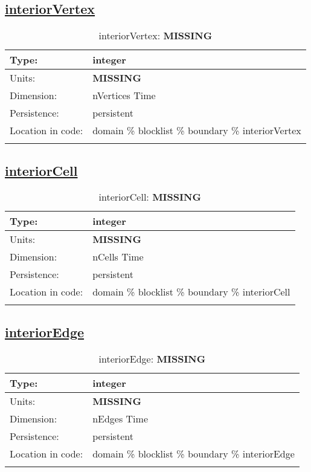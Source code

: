 \subsection[interiorVertex]{\hyperref[sec:var_tab_boundary]{interiorVertex}}
\label{subsec:var_sec_boundary_interiorVertex}
\begin{center}
\begin{longtable}{| p{2.0in} | p{4.0in} |}
        \hline 
        Type: & integer \\
        \hline 
        Units: & {\bf \color{red} MISSING} \\
        \hline 
        Dimension: & nVertices Time \\
        \hline 
        Persistence: & persistent \\
        \hline 
         Location in code: & domain \% blocklist \% boundary \% interiorVertex \\
         \hline 
    \caption{interiorVertex: {\bf \color{red} MISSING}}
\end{longtable}
\end{center}
\subsection[interiorCell]{\hyperref[sec:var_tab_boundary]{interiorCell}}
\label{subsec:var_sec_boundary_interiorCell}
\begin{center}
\begin{longtable}{| p{2.0in} | p{4.0in} |}
        \hline 
        Type: & integer \\
        \hline 
        Units: & {\bf \color{red} MISSING} \\
        \hline 
        Dimension: & nCells Time \\
        \hline 
        Persistence: & persistent \\
        \hline 
         Location in code: & domain \% blocklist \% boundary \% interiorCell \\
         \hline 
    \caption{interiorCell: {\bf \color{red} MISSING}}
\end{longtable}
\end{center}
\subsection[interiorEdge]{\hyperref[sec:var_tab_boundary]{interiorEdge}}
\label{subsec:var_sec_boundary_interiorEdge}
\begin{center}
\begin{longtable}{| p{2.0in} | p{4.0in} |}
        \hline 
        Type: & integer \\
        \hline 
        Units: & {\bf \color{red} MISSING} \\
        \hline 
        Dimension: & nEdges Time \\
        \hline 
        Persistence: & persistent \\
        \hline 
         Location in code: & domain \% blocklist \% boundary \% interiorEdge \\
         \hline 
    \caption{interiorEdge: {\bf \color{red} MISSING}}
\end{longtable}
\end{center}
